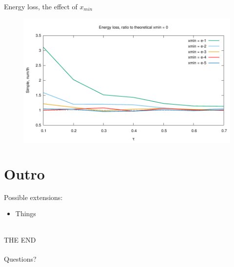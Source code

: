 \documentclass[pstricks,mathserif]{beamer}
\begin{document}
\begin{frame}
Energy loss, the effect of $x_{min}$
\begin{figure}
\centering
\includegraphics[width=1\linewidth]{energyloss_xmins.pdf}
\end{figure}

\end{frame}

\section{Outro}
\begin{frame}


Possible extensions:

\begin{itemize}
\item Things
\end{itemize}
~\\
\center THE END\\
~\\
Questions?

\end{frame}
\end{document}
